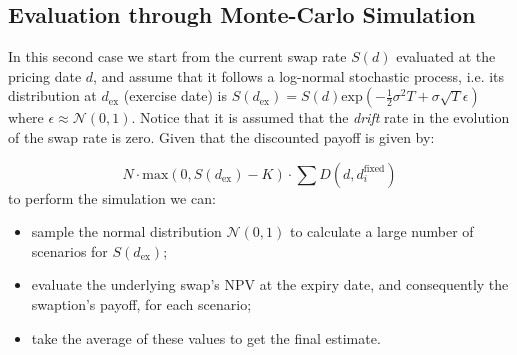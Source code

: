 \subsection{Evaluation through Monte-Carlo Simulation}\label{evaluation-through-monte-carlo-simulation}

In this second case we start from the current swap rate \(S(d)\)
evaluated at the pricing date \(d\), and assume that it follows a
log-normal stochastic process, i.e. its distribution at
\(d_{\mathrm{ex}}\) (exercise date) is
\(S(d_{\mathrm{ex}}) = S(d)\mathrm{exp}(-\frac{1}{2}\sigma^{2}T+\sigma\sqrt{T}\epsilon)\)
where \(\epsilon\approx\mathcal{N}(0,1)\). Notice that it is assumed
that the \emph{drift} rate in the evolution of the swap rate is zero.
Given that the discounted payoff is given by:

\[N\cdot \mathrm{max}(0, S(d_{\mathrm{ex}}) - K)\cdot\sum D(d, d_i^{\mathrm{fixed}})\]
to perform the simulation we can:

\begin{itemize}
\tightlist
\item
  sample the normal distribution \(\mathcal{N}(0, 1)\) to calculate a
  large number of scenarios for \(S(d_{\mathrm{ex}})\);
\item
  evaluate the underlying swap's NPV at the expiry date, and
  consequently the swaption's payoff, for each scenario;
\item
  take the average of these values to get the final estimate.
\end{itemize}

